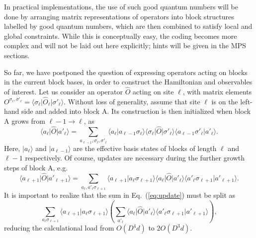 \documentclass[a4paper,10pt,oneside,onecolumn,1p,times]{elsarticle}
\newcommand{\bra}[1]{\mbox{$\langle #1  |$}}
\newcommand{\ket}[1]{\mbox{$| #1  \rangle$}}
\newcommand{\braket}[2]{\mbox{$\langle #1  | #2 \rangle$}} 	%
\begin{document}
In practical implementations, the use of such good quantum numbers will be done by arranging matrix representations of operators into block structures labelled by good quantum numbers, which are then combined to satisfy local and global constraints. While this is conceptually easy, the coding becomes more complex and will not be laid out here explicitly; hints will be given in the MPS sections.
 
So far, we have postponed the question of expressing operators acting on blocks in the current block bases, in order to construct the Hamiltonian and observables of interest. Let us consider an operator $\hat{O}$ acting on site $\ell$, with matrix elements $O^{\sigma_\ell,\sigma'_\ell}=\bra{\sigma_\ell} \hat{O}_{\ell} \ket{\sigma'_\ell}$. Without loss of generality, assume that site $\ell$ is on the left-hand side and added into block A. Its construction is then initialized when block A grows from $\ell-1 \rightarrow \ell$, as 
\begin{equation}
\bra{a_\ell} \hat{O} \ket{a'_\ell} = \sum_{a_{\ell-1},\sigma_\ell,\sigma'_\ell}
\braket{a_\ell}{a_{\ell-1}\sigma_\ell} \bra{\sigma_\ell} \hat{O} \ket{\sigma'_\ell} \braket{a_{\ell-1}\sigma'_\ell}{a'_\ell} .
\end{equation}
Here, $ \ket{a_\ell}$ and $\ket{a_{\ell-1}}$ are the effective basis states of blocks of length $\ell$ and $\ell-1$ respectively. Of course, updates are necessary during the further growth steps of block A, e.g.\
\begin{equation}
\bra{a_{\ell+1}} \hat{O} \ket{a'_{\ell+1}} = \sum_{a_{\ell},a'_{\ell}\sigma_{\ell+1}}
\braket{a_{\ell+1}}{a_{\ell}\sigma_{\ell+1}} \bra{a_\ell} \hat{O} \ket{a'_\ell} \braket{a'_{\ell}\sigma_{\ell+1}}{a'_{\ell+1}} .
\label{eq:update}
\end{equation}
It is important to realize that the sum in Eq.~(\ref{eq:update}) must be split as 
\begin{equation}
\sum_{a_{\ell}\sigma_{\ell+1}} \braket{a_{\ell+1}}{a_{\ell}\sigma_{\ell+1}} \left( \sum_{a'_{\ell}}
 \bra{a_\ell} \hat{O} \ket{a'_\ell} \braket{a'_{\ell}\sigma_{\ell+1}}{a'_{\ell+1}} \right),
\end{equation}
reducing the calculational load from $O(D^4 d)$ to $2O(D^3 d)$. 
\end{document}
